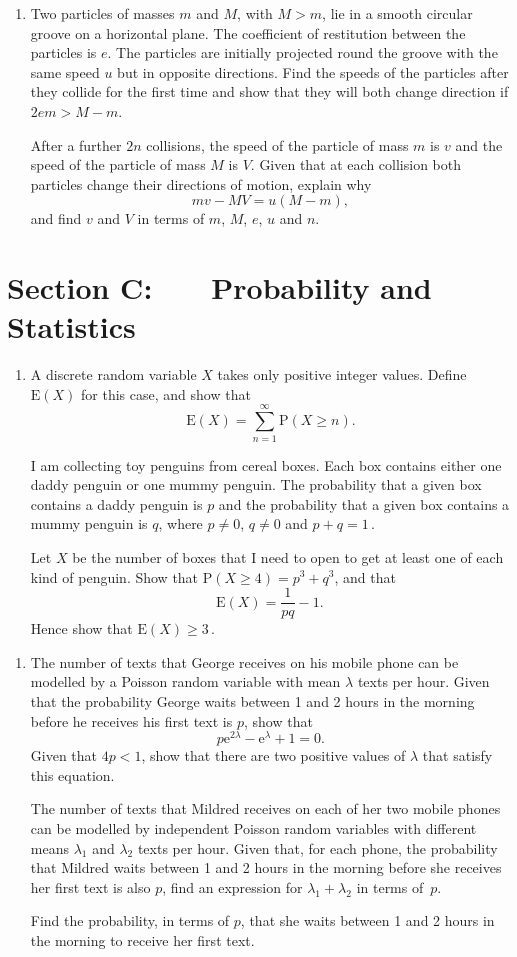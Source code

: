 \documentclass[a4, 11pt]{report}
\newlength{\qspace}
\newcounter{qnumber}
\newenvironment{question}%
 {\vspace{\qspace}
  \begin{enumerate}[\bfseries 1\quad][10]%
    \setcounter{enumi}{\value{qnumber}}%
    \item%
 }
{
  \end{enumerate}
  \filbreak
  \stepcounter{qnumber}
 }
\def\e{{\mathrm e}}
\def\E{{\mathrm E}}
\def\P{{\mathrm P}}
\def\ge{\geqslant}
\begin{document}

\begin{question}
Two particles  of masses $m$ and $M$, with $M>m$,
lie in  a smooth circular groove on a horizontal plane. The coefficient
of restitution between the particles is $e$. The particles are initially
projected round the groove
with the same speed $u$ but in opposite directions. Find the
speeds of the particles after they collide for the first time and show
that they will both change direction if $2em> M-m$. 

After a further $2n$ collisions, the speed of the particle of mass $m$ is $v$
and the speed of the particle of mass $M$ is $V$. Given
that  at each collision both particles change 
their directions of motion, explain why  
\[
mv-MV  = u(M-m),
\]
and find $v$ and $V$ in terms of $m$, $M$, $e$, $u$ and $n$.
\end{question}
	

	
	\newpage
\section*{Section C: \ \ \ Probability and Statistics}


\begin{question}
A discrete random variable $X$ takes only positive integer values.
 Define $\E(X)$ for this case, and 
show that 
\[\E(X)      =\sum^{\infty}_{n=1}\P\left(X\ge n \right).\]

I am  collecting toy penguins from cereal boxes. Each box 
contains either one daddy penguin or one mummy penguin. The 
probability that a given box contains a daddy penguin is $p$ 
and the probability that a given box contains a mummy penguin is
$q$,
where $p\ne0$, $q\ne0$ and $p+q=1\,$.

 Let $X$       be the number of boxes that I
need to open to get at least one of each kind of penguin. Show that 
$\P(X\ge 4)= p^{3}+q^{3}$,   and that 
\[
\E(X)=\frac{1}{pq}-1.\,
\] 
Hence show that $\E(X)\ge 3\,$.
\end{question}

\begin{question}
The number of texts that George receives on his 
mobile phone can be modelled by a Poisson random variable 
with mean $\lambda$ texts per hour. Given that the
probability George waits between 1 and 2 hours in 
the morning before he receives his first text is
$p$, show that
\[
p\e^{2\lambda}-\e^{\lambda}+1=0.
\]
Given that $4p<1$, show that there are two positive
values of $\lambda$ that satisfy this equation. 

The
number of texts that Mildred receives on each
of her two mobile phones 
can  be modelled by independent Poisson random variables
with different means $\lambda_{1}$ and $\lambda_{2}$ texts per hour.
Given that, for each phone, the probability that Mildred waits between
1 and 2 hours in the morning before she receives her first 
text is also $p$, find an expression for $\lambda_{1}+\lambda_{2}$
in terms of~$p$. 

Find  the probability, in terms of $p$,
that she waits between 1 and 2 hours in the morning 
to receive her first text.
\end{question}
\end{document}
